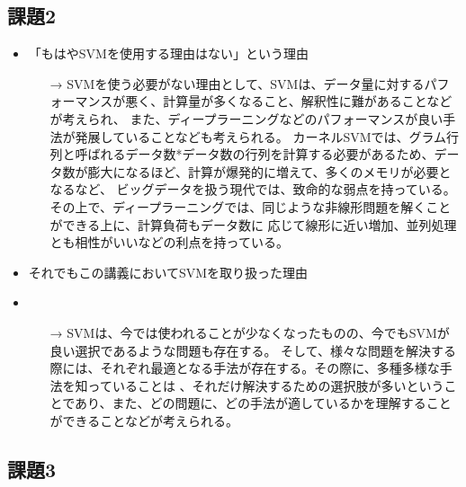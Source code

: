 \subsection{課題2}
\begin{itemize}
  \item 「もはやSVMを使用する理由はない」という理由
  \begin{itemize}
    \item[→] SVMを使う必要がない理由として、SVMは、データ量に対するパフォーマンスが悪く、計算量が多くなること、解釈性に難があることなどが考えられ、
    また、ディープラーニングなどのパフォーマンスが良い手法が発展していることなども考えられる。
    カーネルSVMでは、グラム行列と呼ばれるデータ数*データ数の行列を計算する必要があるため、データ数が膨大になるほど、計算が爆発的に増えて、多くのメモリが必要となるなど、
    ビッグデータを扱う現代では、致命的な弱点を持っている。
    その上で、ディープラーニングでは、同じような非線形問題を解くことができる上に、計算負荷もデータ数に
    応じて線形に近い増加、並列処理とも相性がいいなどの利点を持っている。
  \end{itemize}
  \item それでもこの講義においてSVMを取り扱った理由
  \item \begin{itemize}
    \item[→] SVMは、今では使われることが少なくなったものの、今でもSVMが良い選択であるような問題も存在する。
    そして、様々な問題を解決する際には、それぞれ最適となる手法が存在する。その際に、多種多様な手法を知っていることは
    、それだけ解決するための選択肢が多いということであり、また、どの問題に、どの手法が適しているかを理解することができることなどが考えられる。
  \end{itemize}
\end{itemize}

\subsection{課題3}